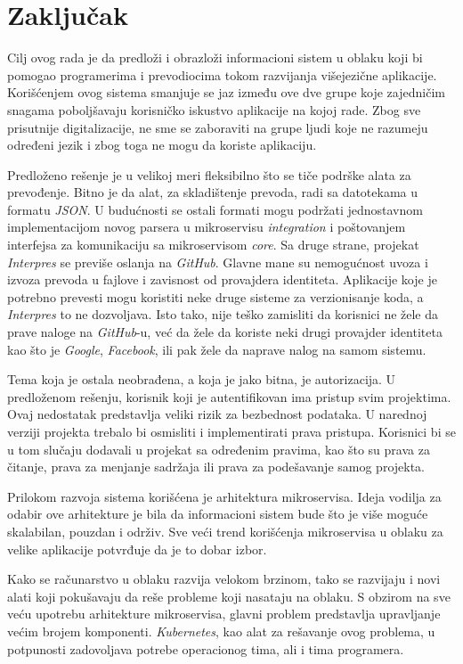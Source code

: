 \chapter{Zaključak}\label{ch:zakljucak}

Cilj ovog rada je da predloži i obrazloži informacioni sistem u oblaku koji bi pomogao 
programerima i prevodiocima tokom razvijanja višejezične aplikacije. Korišćenjem ovog 
sistema smanjuje se jaz između ove dve grupe koje zajedničim snagama poboljšavaju 
korisničko iskustvo aplikacije na kojoj rade. Zbog sve prisutnije digitalizacije, 
ne sme se zaboraviti na grupe ljudi koje ne razumeju određeni jezik i zbog toga 
ne mogu da koriste aplikaciju.

Predloženo rešenje je u velikoj meri fleksibilno što se tiče podrške alata za prevođenje.
Bitno je da alat, za skladištenje prevoda, radi sa datotekama u formatu \textit{JSON}. 
U budućnosti se ostali formati mogu podržati jednostavnom implementacijom novog parsera
u mikroservisu \textit{integration} i poštovanjem interfejsa za komunikaciju sa 
mikroservisom \textit{core}. Sa druge strane, projekat \textit{Interpres} se previše 
oslanja na \textit{GitHub}. Glavne mane su nemogućnost uvoza i izvoza prevoda u fajlove 
i zavisnost od provajdera identiteta. Aplikacije koje je potrebno prevesti mogu koristiti 
neke druge sisteme za verzionisanje koda, a \textit{Interpres} to ne dozvoljava. Isto tako, 
nije teško zamisliti da korisnici ne žele da prave naloge na \textit{GitHub}-u, već da 
žele da koriste neki drugi provajder identiteta kao što je \textit{Google},
\textit{Facebook}, ili pak žele da naprave nalog na samom sistemu.

Tema koja je ostala neobrađena, a koja je jako bitna, je autorizacija. U predloženom rešenju,
korisnik koji je autentifikovan ima pristup svim projektima. Ovaj nedostatak predstavlja 
veliki rizik za bezbednost podataka. U narednoj verziji projekta trebalo bi osmisliti i 
implementirati prava pristupa. Korisnici bi se u tom slučaju dodavali u projekat sa određenim 
pravima, kao što su prava za čitanje, prava za menjanje sadržaja ili prava za podešavanje 
samog projekta.

Prilokom razvoja sistema korišćena je arhitektura mikroservisa. Ideja vodilja za odabir 
ove arhitekture je bila da informacioni sistem bude što je više moguće skalabilan, 
pouzdan i održiv. Sve veći trend korišćenja mikroservisa u oblaku za velike aplikacije 
potvrđuje da je to dobar izbor. 

Kako se računarstvo u oblaku razvija velokom brzinom, tako se razvijaju i novi alati 
koji pokušavaju da reše probleme koji nasataju na oblaku. S obzirom na sve veću upotrebu 
arhitekture mikroservisa, glavni problem predstavlja upravljanje većim brojem komponenti.
\textit{Kubernetes}, kao alat za rešavanje ovog problema, u potpunosti zadovoljava 
potrebe operacionog tima, ali i tima programera.

